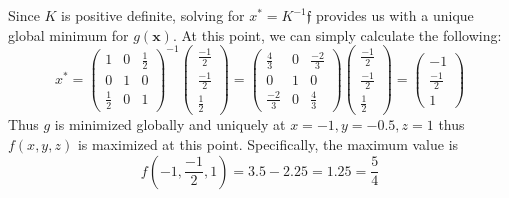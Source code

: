 \documentclass{article}
\begin{document}
Since $K$ is positive definite, solving for $x^{*} = K^{-1}\mathfrak{f}$ provides us with a unique global minimum for $g(\mathbf{x})$.  At this point, we can simply calculate the following:
\begin{equation*}
    x^{*} = \begin{pmatrix}
        1 & 0 & \frac{1}{2}\\
        0 & 1 & 0\\
        \frac{1}{2} & 0 & 1
    \end{pmatrix}^{-1}\begin{pmatrix}
        \frac{-1}{2}\\
        \frac{-1}{2}\\
        \frac{1}{2}
    \end{pmatrix} = \begin{pmatrix}
        \frac{4}{3} & 0 & \frac{-2}{3}\\
        0 & 1 & 0\\
        \frac{-2}{3} & 0 & \frac{4}{3}
    \end{pmatrix}\begin{pmatrix}
        \frac{-1}{2}\\
        \frac{-1}{2}\\
        \frac{1}{2}
    \end{pmatrix} = \begin{pmatrix}
        -1\\
        \frac{-1}{2}\\
        1
    \end{pmatrix}
\end{equation*}
Thus $g$ is minimized globally and uniquely at $x = -1, y = -0.5, z = 1$ thus $f(x,y,z)$ is maximized at this point. Specifically, the maximum value is 
\begin{equation*}
    f\left(-1, \frac{-1}{2}, 1\right) = 3.5 - 2.25 = 1.25 = \frac{5}{4}
\end{equation*}
\end{document}
